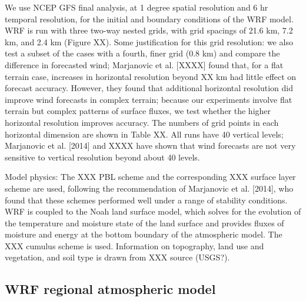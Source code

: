 \documentclass[12pt]{amsart}
\begin{document}
We use NCEP GFS final analysis, at 1 degree spatial resolution and 6 hr temporal resolution, for the initial and boundary conditions of the WRF model.  WRF is run with three two-way nested grids, with grid spacings of 21.6 km, 7.2 km, and 2.4 km (Figure XX).  Some justification for this grid resolution: we also test a subset of the cases with a fourth, finer grid (0.8 km) and compare the difference in forecasted wind; Marjanovic et al. [XXXX] found that, for a flat terrain case, increases in horizontal resolution beyond XX km had little effect on forecast accuracy.  However, they found that additional horizontal resolution did improve wind forecasts in complex terrain; because our experiments involve flat terrain but complex patterns of surface fluxes, we test whether the higher horizontal resolution improves accuracy.  The numbers of grid points in each horizontal dimension are shown in Table XX.  All runs have 40 vertical levels; Marjanovic et al. [2014] and XXXX have shown that wind forecasts are not very sensitive to vertical resolution beyond about 40 levels.

Model physics: The XXX PBL scheme and the corresponding XXX surface layer scheme are used, following the recommendation of Marjanovic et al. [2014], who found that these schemes performed well under a range of stability conditions.  WRF is coupled to the Noah land surface model, which solves for the evolution of the temperature and moisture state of the land surface and provides fluxes of moisture and energy at the bottom boundary of the atmospheric model.  The XXX cumulus scheme is used.  Information on topography, land use and vegetation, and soil type is drawn from XXX source (USGS?).

\subsection{WRF regional atmospheric model}
\end{document}
